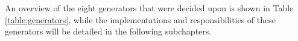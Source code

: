 An overview of the eight generators that were decided upon is shown in Table \ref{table:generators}, while the implementations and responsibilities of these generators will be detailed in the following subchapters.










